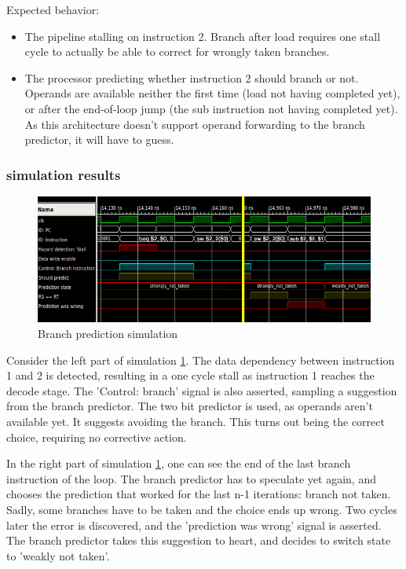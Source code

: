 Expected behavior:
\begin{itemize}
  \item
    The pipeline stalling on instruction 2. Branch after load requires one stall cycle to actually be able to correct for wrongly taken branches.
  \item
    The processor predicting whether instruction 2 should branch or not.
    Operands are available neither the first time (load not having completed yet), or after the end-of-loop jump (the sub instruction not having completed yet).
    As this architecture doesn't support operand forwarding to the branch predictor, it will have to guess.
\end{itemize}

\subsubsection*{simulation results}

\begin{figure}[H]
  \begin{center}
    \includegraphics[width=\textwidth]{assets/branch-prediction.png}
  \end{center}
  \caption{Branch prediction simulation}
  \label{fig:simulate_branch_prediction}
\end{figure}

Consider the left part of simulation \ref{fig:simulate_branch_prediction}.
The data dependency between instruction 1 and 2 is detected, resulting in a one cycle stall as instruction 1 reaches the decode stage.
The 'Control: branch' signal is also asserted, sampling a suggestion from the branch predictor.
The two bit predictor is used, as operands aren't available yet. It suggests avoiding the branch.
This turns out being the correct choice, requiring no corrective action.

In the right part of simulation \ref{fig:simulate_branch_prediction}, one can see the end of the last branch instruction of the loop.
The branch predictor has to speculate yet again, and chooses the prediction that worked for the last n-1 iterations: branch not taken.
Sadly, some branches have to be taken and the choice ends up wrong.
Two cycles later the error is discovered, and the 'prediction was wrong' signal is asserted.
The branch predictor takes this suggestion to heart, and decides to switch state to 'weakly not taken'.

